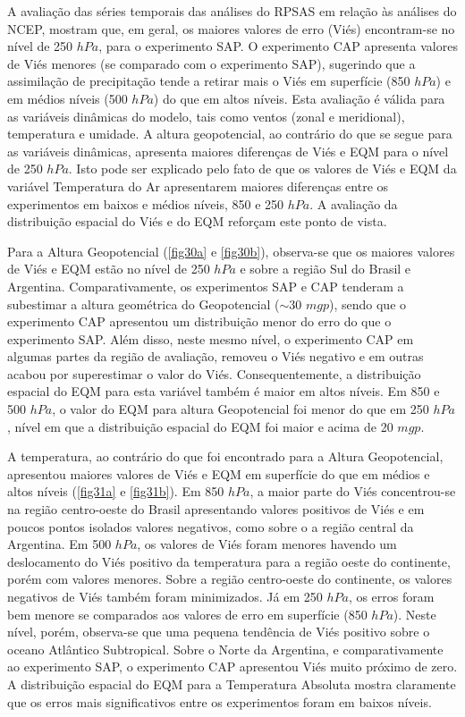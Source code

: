A avaliação das séries temporais das análises do RPSAS em relação às análises do NCEP, mostram que, em geral, os maiores valores de erro (Viés) encontram-se no nível de 250 $hPa$, para o experimento SAP. O experimento CAP apresenta valores de Viés menores (se comparado com o experimento SAP), sugerindo que a assimilação de precipitação tende a retirar mais o Viés em superfície (850 $hPa$) e em médios níveis (500 $hPa$) do que em altos níveis. Esta avaliação é válida para as variáveis dinâmicas do modelo, tais como ventos (zonal e meridional), temperatura e umidade. A altura geopotencial, ao contrário do que se segue para as variáveis dinâmicas, apresenta maiores diferenças de Viés e EQM para o nível de 250 $hPa$. Isto pode ser explicado pelo fato de que os valores de Viés e EQM da variável Temperatura do Ar apresentarem maiores diferenças entre os experimentos em baixos e médios níveis, 850 e 250 $hPa$. A avaliação da distribuição espacial do Viés e do EQM reforçam este ponto de vista. 

Para a Altura Geopotencial (\autoref{fig30a} e \autoref{fig30b}), observa-se que os maiores valores de Viés e EQM estão no nível de 250 $hPa$ e sobre a região Sul do Brasil e Argentina. Comparativamente, os experimentos SAP e CAP tenderam a subestimar a altura geométrica do Geopotencial ($\sim$30 $mgp$), sendo que o experimento CAP apresentou um distribuição menor do erro do que o experimento SAP. Além disso, neste mesmo nível, o experimento CAP em algumas partes da região de avaliação, removeu o Viés negativo e em outras acabou por superestimar o valor do Viés. Consequentemente, a distribuição espacial do EQM para esta variável também é maior em altos níveis. Em 850 e 500 $hPa$, o valor do EQM para altura Geopotencial foi menor do que em 250 $hPa$, nível em que a distribuição espacial do EQM foi maior e acima de 20 $mgp$.



A temperatura, ao contrário do que foi encontrado para a Altura Geopotencial, apresentou maiores valores de Viés e EQM em superfície do que em médios e altos níveis (\autoref{fig31a} e \autoref{fig31b}). Em 850 $hPa$, a maior parte do Viés concentrou-se na região centro-oeste do Brasil apresentando valores positivos de Viés e em poucos pontos isolados valores negativos, como sobre o a região central da Argentina. Em 500 $hPa$, os valores de Viés foram menores havendo um deslocamento do Viés positivo da temperatura para a região oeste do continente, porém com valores menores. Sobre a região centro-oeste do continente, os valores negativos de Viés também foram minimizados. Já em 250 $hPa$, os erros foram bem menore se comparados aos valores de erro em superfície (850 $hPa$). Neste nível, porém, observa-se que uma pequena tendência de Viés positivo sobre o oceano Atlântico Subtropical. Sobre o Norte da Argentina, e comparativamente ao experimento SAP, o experimento CAP apresentou Viés muito próximo de zero. A distribuição espacial do EQM para a Temperatura Absoluta mostra claramente que os erros mais significativos entre os experimentos foram em baixos níveis.



